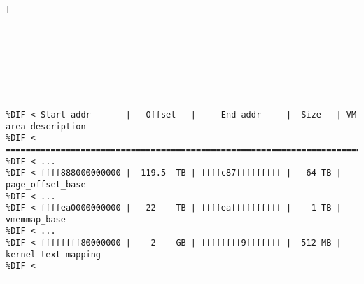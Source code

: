 \DIFdelbegin %
\DIFdelendFL %

\DIFdelbeginFL %
\DIFmodbegin
\begin{lstlisting}[alsolanguage=DIFcode]
[








%DIF < Start addr       |   Offset   |     End addr     |  Size   | VM area description
%DIF < ==================================================================================
%DIF < ...
%DIF < ffff888000000000 | -119.5  TB | ffffc87fffffffff |   64 TB | page_offset_base
%DIF < ...
%DIF < ffffea0000000000 |  -22    TB | ffffeaffffffffff |    1 TB |  vmemmap_base
%DIF < ...
%DIF < ffffffff80000000 |   -2    GB | ffffffff9fffffff |  512 MB | kernel text mapping
%DIF <                 
-\end{lstlisting}
\DIFmodend %
\DIFdelendFL %
\DIFaddbeginFL 

